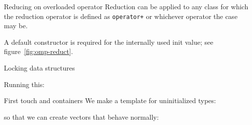 \documentclass[11pt,headernav]{beamer}
\begin{document}
\begin{numberedframe}{Reducing on overloaded operator}
  Reduction can be applied to any class for which the
  reduction operator is defined as \lstinline{operator+}
  or whichever operator the case may be.
  \begin{multicols}{2}
    \columnbreak
  \end{multicols}
  A default constructor is required for the
  internally used init value;
  see figure~\ref{fig:omp-reduct}.
\end{numberedframe}

\begin{numberedframe}{Locking data structures}

  Running this:

\end{numberedframe}

\begin{numberedframe}{First touch and containers}
  We make a template for uninitialized types:

  so that we can create vectors that behave normally:
\end{numberedframe}
\end{document}
